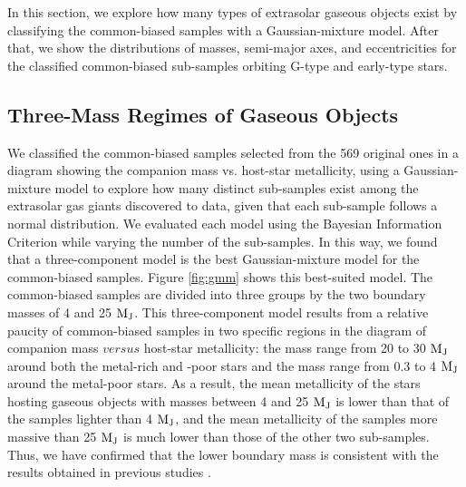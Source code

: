 \documentclass[twocolumn]{aastex62}
\begin{document}
\begin{CJK*}{UTF8}{min}
In this section, we explore how many types of extrasolar gaseous objects exist by classifying the common-biased samples with a Gaussian-mixture model. After that, we show the distributions of masses, semi-major axes, and eccentricities for the classified common-biased sub-samples orbiting G-type and early-type stars.


\subsection{Three-Mass Regimes of Gaseous Objects} \label{subsec:mass}

We classified the common-biased samples selected from the 569 original ones in a diagram showing the companion mass vs. host-star metallicity, using a Gaussian-mixture model to explore how many distinct sub-samples exist among the extrasolar gas giants discovered to data, given that each sub-sample follows a normal distribution. We evaluated each model using the Bayesian Information Criterion while varying the number of the sub-samples. In this way, we found that a three-component model is the best Gaussian-mixture model for the common-biased samples. Figure \ref{fig:gmm} shows this best-suited model. The common-biased samples are divided into three groups by the two boundary masses of 4 and 25 $\rm M_J$. This three-component model results from a relative paucity of common-biased samples in two specific regions in the diagram of companion mass $versus$ host-star metallicity: the mass range from 20 to 30 $\rm M_J$ around both the metal-rich and -poor stars and the mass range from 0.3 to 4 $\rm M_J$ around the metal-poor stars. As a result, the mean metallicity of the stars hosting gaseous objects with masses between 4 and 25 $\rm M_J$ is lower than that of the samples lighter than 4 $\rm M_J$, and the mean metallicity of the samples more massive than 25 $\rm M_J$ is much lower than those of the other two sub-samples. Thus, we have confirmed that the lower boundary mass is consistent with the results obtained in previous studies \citep{2007A&A...464..779R, 2017A&A...603A..30S, 2018ApJ...853...37S}.　


\end{CJK*}
\end{document}

